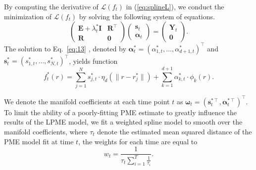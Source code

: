 \documentclass[11pt,reqno]{article}
\newcommand{\T}{\intercal}
\theoremstyle{definition}
\begin{document}
By computing the derivative of $\mathcal{L}(f_t)$ in (\ref{eq:splineL}), we conduct the minimization of $\mathcal{L}(f_t)$ by solving the following system of equations. 
\begin{equation}
  \left(
    \begin{array}{cc}
      \boldsymbol{E} + \lambda_t^* \boldsymbol{I} & \boldsymbol{R}^\T \\
      \boldsymbol{R} & \boldsymbol{0}
    \end{array}
  \right)\left(
    \begin{array}{c}
      \boldsymbol{s}_t \\
      \boldsymbol{\alpha}_t
    \end{array}
  \right) = \left(
    \begin{array}{c}
      \boldsymbol{Y}_t \\
      \boldsymbol{0}
    \end{array}
  \right). \label{eq:13}
\end{equation}
The solution to Eq.~\eqref{eq:13} , denoted by $\boldsymbol{\alpha}^*_t=(\alpha^*_{1,t},\ldots,\alpha^*_{d+1,t})^\T$ and $\boldsymbol{s}^*_t=(s^*_{1,t},\ldots,s^*_{N,t})^\T$, yields function
\begin{equation}\nonumber
  f_t^*(r) = \sum_{j=1}^{N}s_{j,t}^* \cdot  \eta_{d}\left(\|r - r_j^*\|\right) + \sum_{k=1}^{d + 1}\alpha_{k,t}^* \cdot \phi_k(r). 
\end{equation}

We denote the manifold coefficients at each time point $t$ as $\boldsymbol{\omega}_t = (\boldsymbol{s}_t^{*\T}, \boldsymbol{\alpha}_t^{*\T})^\T$. To limit the ability of a poorly-fitting PME estimate to greatly influence the results of the LPME model, we fit a weighted spline model to smooth over the manifold coefficients, where $\tau_t$ denote the estimated mean squared distance of the PME model fit at time $t$, the weights for each time are equal to 
$$w_t = \frac{1}{\tau_t\sum_{i=1}^{T}\frac{1}{\tau_i}}.$$ 
\end{document}
